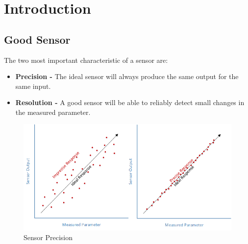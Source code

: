 \documentclass[a4paper,12pt]{report}
\begin{document}
\section{Introduction}
\subsection{Good Sensor}
The two most important characteristic of a sensor are:
\begin{itemize}
 \item \textbf{Precision -} The ideal sensor will always produce the same output for the same input.\cite{Adafruit}  
 \item \textbf{Resolution -} A good sensor will be able to reliably detect small changes in the measured parameter.\cite{Adafruit}
\end{itemize}

\begin{figure}[h!]
\centering
 \includegraphics[width=.80\textwidth]{figures/sensors_Precision.png}
 \caption{Sensor Precision }
\end{figure}
\end{document}
